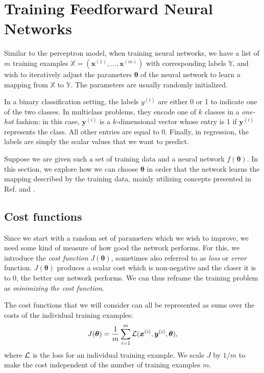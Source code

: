 \section{Training Feedforward Neural Networks}
\label{sec:training}
Similar to the perceptron model, when training neural networks, we have a list of $m$ training examples $\mathbb{X} = (\bm{x}^{(1)}, \ldots, \bm{x}^{(m)})$ with corresponding labels $\mathbb{Y}$, and wish to iteratively adjust the parameters $\bm{\theta}$ of the neural network to learn a mapping from $\mathbb{X}$ to $\mathbb{Y}$. The parameters are usually randomly initialized.

In a binary classification setting, the labels $y^{(i)}$ are either 0 or 1 to indicate one of the two classes. In multiclass problems, they encode one of $k$ classes in a \emph{one-hot} fashion: in this case, $\bm{y}^{(i)}$ is a $k$-dimensional vector whose  entry is 1 if $\bm{y}^{(i)}$ represents the  class. All other entries are equal to 0. Finally, in regression, the labels are simply the scalar values that we want to predict.

Suppose we are given such a set of training data and a neural network $f(\bm{\theta})$. In this section, we explore how we can choose $\bm{\theta}$ in order that the network learns the mapping described by the training data, mainly utilizing concepts presented in Ref. \cite{DBLP:books/daglib/0040158} and \cite{Nielsen2015}.

\subsection{Cost functions}
Since we start with a random set of parameters which we wish to improve, we need some kind of measure of how good the network performs. For this, we introduce the \emph{cost function} $J(\bm{\theta})$, sometimes also referred to as \emph{loss} or \emph{error} function. $J(\bm{\theta})$ produces a scalar cost which is non-negative and the closer it is to 0, the better our network performs. We can thus reframe the training problem as \emph{minimizing the cost function}.

The cost functions that we will consider can all be represented as sums over the costs of the individual training examples:
\begin{equation}
J(\bm{\theta}) = \frac1{m}\sum_{i=1}^{m}\operatorname{\mathcal{L}}(\bm{x}^{(i)},\bm{y}^{(i)},\bm{\theta}),
\end{equation}
where $\operatorname{\mathcal{L}}$ is the loss for an individual training example. We scale $J$ by $1/m$ to make the cost independent of the number of training examples $m$.

